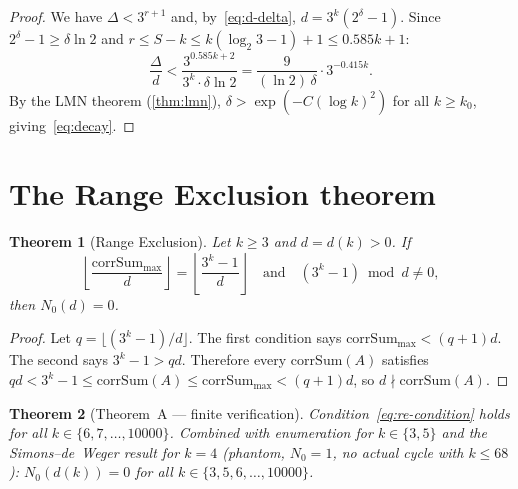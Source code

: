 \documentclass[11pt, a4paper]{amsart}
\theoremstyle{plain}
\newtheorem{theorem}{Theorem}[section]
\theoremstyle{definition}
\theoremstyle{remark}
\newcommand{\corrSum}{\mathrm{corrSum}}
\begin{document}
\begin{proof}
  We have $\Delta < 3^{r+1}$ and, by~\eqref{eq:d-delta},
  $d = 3^k(2^\delta - 1)$.  Since $2^\delta - 1 \geq
  \delta \ln 2$ and $r \leq S - k \leq k(\log_2 3 - 1) + 1
  \leq 0.585k + 1$:
  \[
    \frac{\Delta}{d} < \frac{3^{0.585k+2}}{3^k \cdot \delta \ln 2}
    = \frac{9}{(\ln 2)\,\delta} \cdot 3^{-0.415k}.
  \]
  By the LMN theorem (\cref{thm:lmn}),
  $\delta > \exp(-C(\log k)^2)$ for all $k \geq k_0$,
  giving~\eqref{eq:decay}.
\end{proof}

\section{The Range Exclusion theorem}\label{sec:range-exclusion}

\begin{theorem}[Range Exclusion]\label{thm:re}
  Let $k \geq 3$ and $d = d(k) > 0$.  If
  \begin{equation}\label{eq:re-condition}
    \left\lfloor \frac{\corrSum_{\max}}{d} \right\rfloor
    = \left\lfloor \frac{3^k - 1}{d} \right\rfloor
    \quad\text{and}\quad
    (3^k - 1) \bmod d \neq 0,
  \end{equation}
  then $N_0(d) = 0$.
\end{theorem}

\begin{proof}
  Let $q = \lfloor (3^k - 1)/d \rfloor$.  The first condition
  says $\corrSum_{\max} < (q+1)d$.  The second says
  $3^k - 1 > qd$.  Therefore every $\corrSum(A)$ satisfies
  $qd < 3^k - 1 \leq \corrSum(A) \leq \corrSum_{\max} < (q+1)d$,
  so $d \nmid \corrSum(A)$.
\end{proof}

\begin{theorem}[Theorem~A --- finite verification]\label{thm:finite}
  Condition~\eqref{eq:re-condition} holds for all
  $k \in \{6, 7, \ldots, 10000\}$.
  Combined with enumeration for $k \in \{3, 5\}$
  and the Simons--de~Weger result for $k = 4$
  (phantom, $N_0 = 1$, no actual cycle with $k \leq 68$):
  $N_0(d(k)) = 0$ for all $k \in \{3, 5, 6, \ldots, 10000\}$.
\end{theorem}
\end{document}
